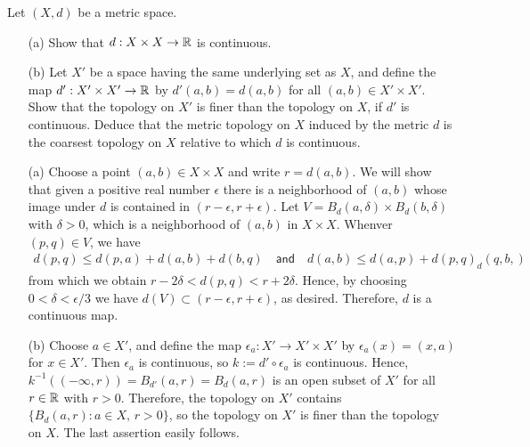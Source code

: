 \begin{prob}
    Let $(X, d)$ be a metric space.
    \begin{enumerate}
        \item[(a)]
        {
            Show that $d: X\times X\rightarrow{\mathbb{R}}$ is continuous.
        }
        \item[(b)]
        {
            Let $X'$ be a space having the same underlying set as $X$, and define the map $d': X'\times X'\rightarrow{\mathbb{R}}$ by $d'(a, b)=d(a, b)$ for all $(a, b)\in X'\times X'$.
            Show that the topology on $X'$ is finer than the topology on $X$, if $d'$ is continuous.
            Deduce that the metric topology on $X$ induced by the metric $d$ is the coarsest topology on $X$ relative to which $d$ is continuous.
        }
    \end{enumerate}
\end{prob}
\begin{sol}
    \begin{enumerate}
        \item[(a)]
        {
            Choose a point $(a, b)\in X\times X$ and write $r=d(a, b)$.
            We will show that given a positive real number $\epsilon$ there is a neighborhood of $(a, b)$ whose image under $d$ is contained in $(r-\epsilon, r+\epsilon)$.
            Let $V=B_d(a, \delta)\times B_d(b, \delta)$ with $\delta>0$, which is a neighborhood of $(a, b)$ in $X\times X$.
            Whenver $(p, q)\in V$, we have
            \begin{align*}
                d(p, q)\leq d(p, a)+d(a, b)+d(b, q)
                \quad\textsf{and}\quad
                d(a, b)\leq d(a, p)+d(p, q)_d(q, b,)
            \end{align*}
            from which we obtain $r-2\delta<d(p, q)<r+2\delta$.
            Hence, by choosing $0<\delta<\epsilon/3$ we have $d(V)\subset(r-\epsilon, r+\epsilon)$, as desired.
            Therefore, $d$ is a continuous map.
        }
        \item[(b)]
        {
            Choose $a\in X'$, and define the map $\epsilon_a: X'\rightarrow X'\times X'$ by $\epsilon_a(x)=(x, a)$ for $x\in X'$.
            Then $\epsilon_a$ is continuous, so $k:=d'\circ\epsilon_a$ is continuous.
            Hence, $k^{-1}((-\infty, r))=B_{d'}(a, r)=B_d(a, r)$ is an open subset of $X'$ for all $r\in{\mathbb{R}}$ with $r>0$.
            Therefore, the topology on $X'$ contains $\{B_d(a, r): a\in X,\, r>0\}$, so the topology on $X'$ is finer than the topology on $X$.
            The last assertion easily follows.
        }
    \end{enumerate}
\end{sol}